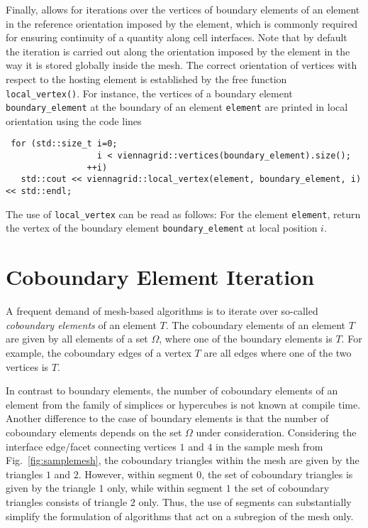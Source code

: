 
Finally, {\ViennaGrid} allows for iterations over the vertices of boundary elements of an element in the reference orientation imposed by the element, which is commonly required for ensuring continuity of a quantity along cell interfaces. Note that by default the iteration is carried out along the orientation imposed by the element in the way it is stored globally inside the mesh.
The correct orientation of vertices with respect to the hosting element is established by the free function \lstinline|local_vertex()|.
For instance, the vertices of a boundary element \lstinline|boundary_element| at the boundary of an element \lstinline|element| are printed in local orientation using the code lines
\begin{lstlisting}
 for (std::size_t i=0;
                  i < viennagrid::vertices(boundary_element).size();
                ++i)
   std::cout << viennagrid::local_vertex(element, boundary_element, i) << std::endl;
\end{lstlisting}
The use of \lstinline|local_vertex| can be read as follows: For the element \lstinline|element|, return the vertex of the boundary element \lstinline|boundary_element| at local position $i$.

\section{Coboundary Element Iteration}
A frequent demand of mesh-based algorithms is to iterate over so-called \emph{coboundary elements} of an element $T$.
The coboundary elements of an element $T$ are given by all elements of a set $\Omega$, where one of the boundary elements is $T$.
For example, the coboundary edges of a vertex $T$ are all edges where one of the two vertices is $T$.

In contrast to boundary elements, the number of coboundary elements of an element from the family of simplices or hypercubes is not known at compile time.
Another difference to the case of boundary elements is that the number of coboundary elements depends on the set $\Omega$ under consideration.
Considering the interface edge/facet connecting vertices $1$ and $4$ in the sample mesh from Fig.~\ref{fig:samplemesh}, the coboundary triangles within the mesh are given by the triangles $1$ and $2$.
However, within segment $0$, the set of coboundary triangles is given by the triangle $1$ only, while within segment $1$ the set of coboundary triangles consists of triangle $2$ only.
Thus, the use of segments can substantially simplify the formulation of algorithms that act on a subregion of the mesh only.


